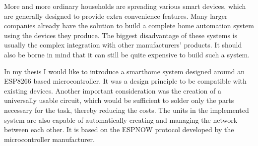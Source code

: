 More and more ordinary households are spreading various smart devices, which are generally designed to provide extra convenience features. Many larger companies already have the solution to build a complete home automation system using the devices they produce. The biggest disadvantage of these systems is usually the complex integration with other manufacturers' products. It should also be borne in mind that it can still be quite expensive to build such a system.

In my thesis I would like to introduce a smarthome system designed around an ESP8266 based microcontroller. It was a design principle to be compatible with existing devices. Another important consideration was the creation of a universally usable circuit, which would be sufficient to solder only the parts necessary for the task, thereby reducing the costs.
The units in the implemented system are also capable of automatically creating and managing the network between each other. It is based on the ESPNOW protocol developed by the microcontroller manufacturer.


\vfill
\selectthesislanguage

\setcounter{romanPage}{\value{page}}
